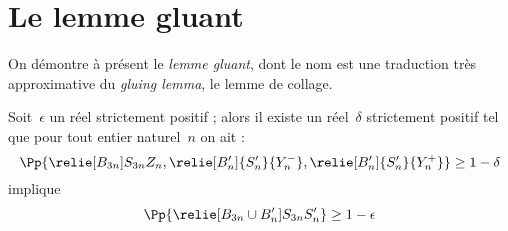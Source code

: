 \section{Le lemme gluant}
	On démontre à présent le \emph{lemme gluant}, dont le nom est une traduction très approximative du \emph{gluing lemma}, le lemme de collage.
	
	\begin{lem}
		Soit~$\epsilon$ un réel strictement positif ; alors il existe un réel~$\delta$ strictement positif tel que pour tout entier naturel~$n$ on ait :
		\[
			\Pp{\relie[B_{3n}]{S_{3n}}{Z_n},
				\relie[B_n']{S_n'}{Y_n^-},
				\relie[B_n']{S_n'}{Y_n^+}}
			\geq 1 - \delta
		\]
		implique
		\[
			\Pp{\relie[B_{3n}\cup B_n']{S_{3n}}{S_n'}}
			\geq 1 - \epsilon
		\]
	\end{lem}
